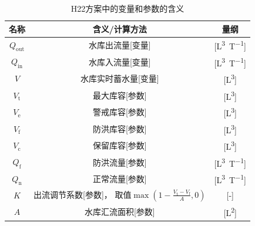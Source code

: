 \begin{table}[htbp]
  \centering
  \caption{H22方案中的变量和参数的含义}
  \label{tab:H22方案变量参数表}
  \begin{tabular}{ccc}
    \toprule
    名称                                                                & 含义/计算方法                   & 量纲                \\ \midrule
    $Q_{\mathrm{out}}$                                                  & 水库出流量[变量]                & [\unit{L^3.T^{-1}}] \\
    $Q_{\mathrm{in}}$                                                   & 水库入流量[变量]                & [\unit{L^3.T^{-1}}] \\
    $V$                                                                 & 水库实时蓄水量[变量]            & [\unit{L^3}]        \\
    $V_{\mathrm{t}}$                                                    & 最大库容[参数]                  & [\unit{L^3}]        \\
    $V_{\mathrm{e}}$                                                    & 警戒库容[参数]                  & [\unit{L^3}]        \\
    $V_{\mathrm{f}}$                                                    & 防洪库容[参数]                  & [\unit{L^3}]        \\
    $V_{\mathrm{c}}$                                                    & 保留库容[参数]                  & [\unit{L^3}]        \\
    $Q_{\mathrm{f}}$                                                    & 防洪流量[参数]                  & [\unit{L^3.T^{-1}}] \\
    $Q_{\mathrm{n}}$                                                    & 正常流量[参数]                  & [\unit{L^3.T^{-1}}] \\
    $K$                                                                 & \makecell{出流调节系数[参数]， \\
    取值$\max\left(1-\frac{V_{\mathrm{t}}-V_{\mathrm{f}}}{A},0\right)$} & [-]                            \\
    $A$                                                                 & 水库汇流面积[参数]              & [\unit{L^2}]        \\
    \bottomrule
  \end{tabular}
\end{table}

